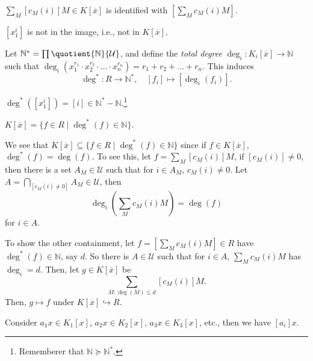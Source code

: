 \begin{explanation}
	\(\sum_{M} [c_M(i)]M \in K[\overline{x} ]\) is identified with \([ \sum_{M} c_M(i)M ]\).

	\begin{note}
		\([x_1^i]\) is not in the image, i.e., not in \(K[\overline{x}]\).
	\end{note}

	Let \(\mathbb{N} ^{\ast} = \prod \quotient{\mathbb{N} }{\mathcal{U} } \), and define the \emph{total degree} \(\deg_i \colon K_i[\overline{x} ] \to \mathbb{N} \) such that \(\deg_i(x_1^{r_1}\cdot x_2^{r_2}\cdot \dots \cdot x_n^{r_n}) = r_1 + r_2 + \dots + r_n\). This induces
	\[
		\deg^{\ast} \colon R \to \mathbb{N} ^{\ast},\quad [f_i] \mapsto [\deg_i(f_i)].
	\]
	\begin{eg}
		\(\deg^{\ast} ([x_1^i]) = [i]\in \mathbb{N} ^{\ast} - \mathbb{N} \).\footnote{Rememberer that \(\mathbb{N} \succeq \mathbb{N} ^{\ast} \).}
	\end{eg}

	\begin{claim}
		\(K[\overline{x} ] = \{ f\in R \mid \deg^{\ast} (f) \in \mathbb{N}  \} \).
	\end{claim}
	\begin{explanation}
		We see that \(K[\overline{x} ] \subseteq \{ f\in R \mid \deg^{\ast} (f)\in \mathbb{N}  \} \) since if \(f\in K[\overline{x} ]\), \(\deg^{\ast} (f) = \deg(f)\). To see this, let \(f = \sum_{M} [c_M(i)]M\), if \([c_M(i)] \neq 0\), then there is a set \(A_M\in \mathcal{U} \) such that for \(i\in A_M\), \(c_M(i) \neq 0\). Let \(A = \bigcap_{[c_M(i) \neq 0]} A_M \in \mathcal{U} \), then
		\[
			\deg_{i}\left( \sum_{M} c_M(i) M \right) = \deg(f)
		\]
		for \(i\in A\).

		To show the other containment, let \(f = [\sum_{M} c_M(i)M]\in R\) have \(\deg^{\ast} (f)\in \mathbb{N} \), say \(d\). So there is \(A\in \mathcal{U} \) such that for \(i\in A\), \(\sum_{M} c_M(i) M\) has \(\deg_i=d\). Then, let \(g\in K[\overline{x} ]\) be
		\[
			\sum_{M \colon \deg(M) \leq d} [c_M(i)]M.
		\]
		Then, \(g \mapsto f\) under \(K[\overline{x} ] \hookrightarrow R\).
	\end{explanation}

	\begin{intuition}
		Consider \(a_1 x \in K_1[x]\), \(a_2 x \in K_2[x]\), \(a_3 x \in K_3[x]\), etc., then we have \([a_i] x\).
	\end{intuition}


\end{explanation}


